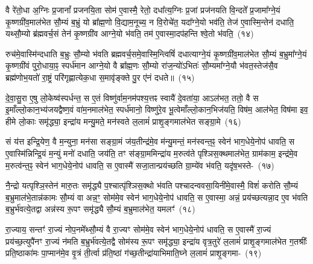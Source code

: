 वै रे॑तो॒धा अ॒ग्निः प्र॒जानां᳚ प्रजनयि॒ता सोम॑ ए॒वास्मै॒ रेतो॒ दधा᳚त्य॒ग्निः प्र॒जां प्रज॑नयति वि॒न्दते᳚ प्र॒जामा᳚ग्ने॒यं कृ॒ष्ण\-ग्री॑व॒माल॑भेत सौ॒म्यं ब॒भ्रुं यो ब्रा᳚ह्म॒णो वि॒द्याम॒नूच्य॒ न वि॒रोचे॑त॒ यदा᳚ग्ने॒यो भव॑ति॒ तेज॑ ए॒वास्मि॒न्तेन॑ दधाति॒ यथ्सौ॒म्यो ब्र॑ह्मवर्च॒सं तेन॑ कृ॒ष्णग्री॑व आग्ने॒यो भ॑वति॒ तम॑ ए॒वास्मा॒दप॑हन्ति श्वे॒तो भ॑वति॒~(१४)\ip

रुच॑मे॒वास्मि॑न्दधाति ब॒भ्रुः सौ॒म्यो भ॑वति ब्रह्मवर्च॒स\-मे॒वास्मि॒न्त्विषिं॑ दधात्याग्ने॒यं कृ॒ष्ण\-ग्री॑व॒मा\-ल॑भेत सौ॒म्यं ब॒भ्रुमा᳚ग्ने॒यं कृ॒ष्णग्री॑वं पुरो॒धाया॒ꣴ॒ स्पर्ध॑मान आग्ने॒यो वै ब्रा᳚ह्म॒णः सौ॒म्यो रा॑ज॒न्यो॑\-ऽभितः॑ सौ॒म्यमा᳚ग्ने॒यौ भ॑वत॒स्तेज॑सै॒व ब्रह्म॑णोभ॒यतो॑ रा॒ष्ट्रं परि॑\-गृह्णात्येक॒धा स॒मावृ॑ङ्क्ते पु॒र ए॑नं दधते॥~(१५)\ip

{}

दे॒वा॒सु॒रा ए॒षु लो॒केष्व॑स्पर्धन्त॒ स ए॒तं विष्णु॑र्वाम॒नम॑\-पश्य॒त्तꣴ स्वायै॑ दे॒वता॑या॒ आ\-ऽल॑भत॒ ततो॒ वै स इ॒माँल्लो॒कान॒भ्य॑\-जयद्वैष्ण॒वं वा॑म॒नमा\-ल॑भेत॒ स्पर्ध॑मानो॒ विष्णु॑रे॒व भू॒त्वेमाँल्लो॒कान॒भिज॑यति॒ विष॑म॒ आ\-ल॑भेत॒ विष॑मा इव॒ हीमे लो॒काः समृ॑द्ध्या॒ इन्द्रा॑य मन्यु॒मते॒ मन॑स्वते ल॒लामं॑ प्राशृ॒ङ्गमाल॑भेत सङ्ग्रा॒मे~(१६)\ip

सं य॑त्त इन्द्रि॒येण॒ वै म॒न्युना॒ मन॑सा सङ्ग्रा॒मं ज॑य॒तीन्द्र॑मे॒व म॑न्यु॒मन्तं॒ मन॑स्वन्त॒ꣴ॒ स्वेन॑ भाग॒धेये॒नोप॑ धावति॒ स ए॒वास्मि॑न्निन्द्रि॒यं म॒न्युं मनो॑ दधाति॒ जय॑ति॒ तꣳ स॑ङ्ग्रा॒ममिन्द्रा॑य म॒रुत्व॑ते पृश्ञिस॒क्थमा\-ल॑भेत॒ ग्राम॑काम॒ इन्द्र॑मे॒व म॒रुत्व॑न्त॒ꣴ॒ स्वेन॑ भाग॒धेये॒नोप॑ धावति॒ स ए॒वास्मै॑ सजा॒तान्प्रय॑च्छति ग्रा॒म्ये॑व भ॑वति॒ यदृ॑ष॒भस्ते-~(१७)\ip

नै॒न्द्रो यत्पृश्ञि॒स्तेन॑ मारु॒तः समृ॑द्ध्यै प॒श्चात्पृ॑श्ञिस॒क्थो भ॑वति पश्चादन्ववसा॒यिनी॑\-मे॒वा\-स्मै॒ विशं॑ करोति सौ॒म्यं ब॒भ्रुमाल॑भे॒तान्न॑कामः सौ॒म्यं वा अन्न॒ꣳ॒ सोम॑मे॒व स्वेन॑ भाग॒धेये॒नोप॑ धावति॒ स ए॒वास्मा॒ अन्नं॒ प्रय॑च्छत्यन्ना॒द ए॒व भ॑वति ब॒भ्रुर्भ॑वत्ये॒तद्वा अन्न॑स्य रू॒पꣳ समृ॑द्ध्यै सौ॒म्यं ब॒भ्रुमा\-ल॑भेत॒ यमलꣳ॑~(१८)\ip

रा॒ज्याय॒ सन्तꣳ॑ रा॒ज्यं नोप॒नमे᳚थ्सौ॒म्यं वै रा॒ज्यꣳ सोम॑मे॒व स्वेन॑ भाग॒धेये॒नोप॑ धावति॒ स ए॒वास्मै॑ रा॒ज्यं प्रय॑च्छ॒त्युपै॑नꣳ रा॒ज्यं न॑मति ब॒भ्रुर्भ॑वत्ये॒तद्वै सोम॑स्य रू॒पꣳ समृ॑द्ध्या॒ इन्द्रा॑य वृत्र॒तुरे॑ ल॒लामं॑ प्राशृ॒ङ्गमाल॑भेत ग॒तश्रीः᳚ प्रति॒ष्ठाका॑मः पा॒प्मान॑मे॒व वृ॒त्रं ती॒र्त्वा प्र॑ति॒ष्ठां ग॑च्छ॒तीन्द्रा॑याभिमाति॒घ्ने ल॒लामं॑ प्राशृ॒ङ्गमा-~(१९)\ip

